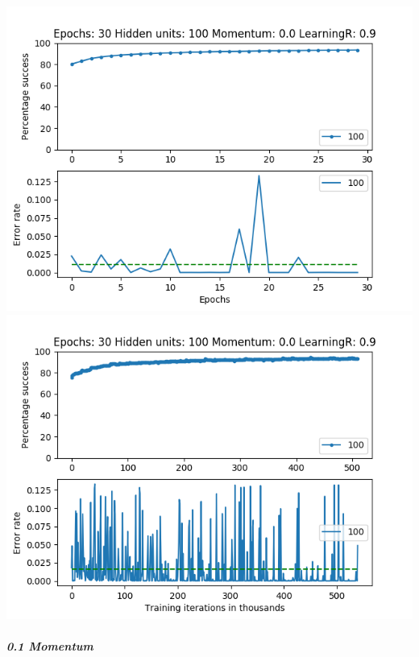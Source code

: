 \documentclass[11pt]{article}
\makeatletter
\def\maxwidth{\ifdim\Gin@nat@width>\linewidth\linewidth
    \else\Gin@nat@width\fi}
\let\Oldincludegraphics\includegraphics
\renewcommand{\includegraphics}[1]{\Oldincludegraphics[width=.8\maxwidth]{#1}}
\makeatother
\begin{document}
\includegraphics{Experiment2/E2_NN_Epoch_Momentum_0.0_30Epochs_100Hiddenunits.png}
\includegraphics{Experiment2/E2_NN_Training_Momentum_0.0_30Epochs_100Hiddenunits.png}

\hypertarget{momentum-1}{%
\subparagraph{0.1 Momentum}\label{momentum-1}}
\end{document}
